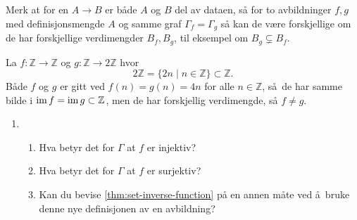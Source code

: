 \begin{remark}
    Merk at for en $A\to B$ er både $A$ og $B$ del av
    dataen, så for to avbildninger $f, g$ med definisjonsmengde
    $A$ og samme graf $\Gamma_f = \Gamma_g$ så kan de være forskjellige
    om de har forskjellige verdimengder $B_f, B_g$,
    til eksempel om $B_g\subsetneq B_f$.
\end{remark}
\begin{example}
    La $f\colon \mathbb Z\to \mathbb Z$ og
    $g\colon \mathbb Z\to 2\mathbb Z$
    hvor
    \[
        2\mathbb Z = \{2n \mid n\in \mathbb Z\}\subset \mathbb Z.
    \]
    Både $f$ og $g$ er gitt ved $f(n) = g(n) = 4n$ for alle $n\in \mathbb Z$,
    så de har samme bilde i $\operatorname{im} f = \operatorname{im} g\subset\mathbb Z$,
    men de har forskjellig verdimengde, så $f\neq g$.
\end{example}
\begin{enumerate}[resume]
    \item
        \begin{enumerate}
            \item Hva betyr det for $\Gamma$ at $f$ er injektiv?
            \item Hva betyr det for $\Gamma$ at $f$ er surjektiv?
            \item Kan du bevise \cref{thm:set-inverse-function} på en annen
                måte ved å bruke denne nye definisjonen av en avbildning?
        \end{enumerate}
\end{enumerate}

